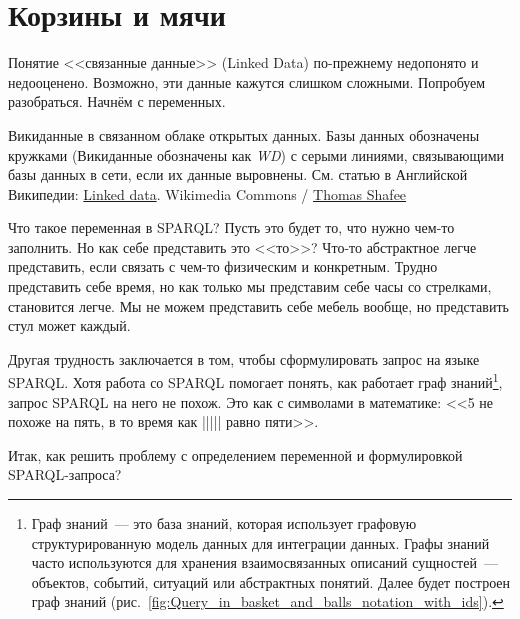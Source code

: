 \chapter{Корзины и мячи}
\label{ch:BucketsAndBalls}


Понятие <<связанные данные>> (Linked Data) по-прежнему недопонято и недооценено. Возможно, эти данные кажутся слишком сложными. 
Попробуем разобраться. Начнём с переменных.

\begin{marginfigure}[0cm]
	{
		\setlength{\fboxsep}{0pt}%
		\setlength{\fboxrule}{1pt}%
	}
    \caption[Викиданные в связанном облаке открытых данных.]{Викиданные в связанном облаке открытых данных. Базы данных обозначены кружками (Викиданные обозначены как \textit{WD}) с серыми линиями, связывающими базы данных в сети, если их данные выровнены. См. статью в Английской Википедии: \href{https://en.wikipedia.org/wiki/Linked_data}{Linked data}. Wikimedia Commons / \href{https://commons.wikimedia.org/wiki/File:Wikidata_in_the_Linked_Open_Data_cloud_2020-08-20.svg}{Thomas Shafee}}
	\label{fig:Wikidata_in_linked_open_data}
\end{marginfigure}

Что такое переменная в SPARQL? Пусть это будет то, что нужно чем-то заполнить. Но как себе представить это <<то>>? Что-то абстрактное легче представить, если связать с чем-то физическим и конкретным. Трудно представить себе время, но как только мы представим себе часы со стрелками, становится легче. Мы не можем представить себе мебель вообще, но представить стул может каждый.

Другая трудность заключается в том, 
чтобы сформулировать запрос на языке SPARQL. 
Хотя работа со SPARQL помогает понять, как работает граф знаний\footnote[][12pt]{%
%
%
Граф знаний~--- это база знаний, которая использует графовую структурированную модель данных для интеграции данных. 
Графы знаний часто используются для хранения взаимосвязанных описаний сущностей~--- объектов, 
событий, ситуаций или абстрактных понятий. 
Далее будет построен граф знаний (рис.~\ref{fig:Query_in_basket_and_balls_notation_with_ids}).%
}, 
запрос SPARQL на него не похож. Это как с символами в математике: <<5 не похоже на пять, в то время как ||||| равно пяти>>.

Итак, как решить проблему с определением переменной и формулировкой SPARQL-запроса?


